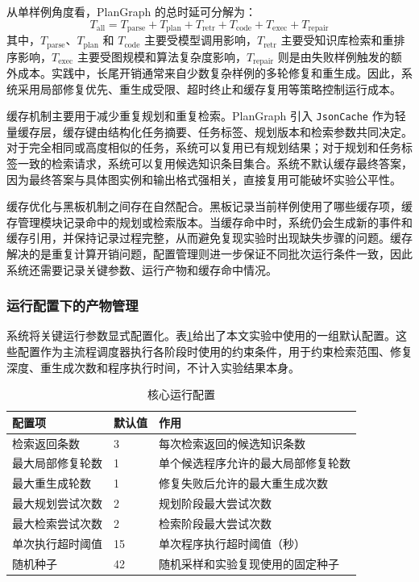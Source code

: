 从单样例角度看，PlanGraph 的总时延可分解为：
\begin{equation}
T_{\mathrm{all}}=T_{\mathrm{parse}}+T_{\mathrm{plan}}+T_{\mathrm{retr}}+T_{\mathrm{code}}+T_{\mathrm{exec}}+T_{\mathrm{repair}}
\end{equation}
其中，$T_{\mathrm{parse}}$、$T_{\mathrm{plan}}$ 和 $T_{\mathrm{code}}$ 主要受模型调用影响，$T_{\mathrm{retr}}$ 主要受知识库检索和重排序影响，$T_{\mathrm{exec}}$ 主要受图规模和算法复杂度影响，$T_{\mathrm{repair}}$ 则是由失败样例触发的额外成本。实践中，长尾开销通常来自少数复杂样例的多轮修复和重生成。因此，系统采用局部修复优先、重生成受限、超时终止和缓存复用等策略控制运行成本。

缓存机制主要用于减少重复规划和重复检索。PlanGraph 引入 \texttt{JsonCache} 作为轻量缓存层，缓存键由结构化任务摘要、任务标签、规划版本和检索参数共同决定。对于完全相同或高度相似的任务，系统可以复用已有规划结果；对于规划和任务标签一致的检索请求，系统可以复用候选知识条目集合。系统不默认缓存最终答案，因为最终答案与具体图实例和输出格式强相关，直接复用可能破坏实验公平性。

缓存优化与黑板机制之间存在自然配合。黑板记录当前样例使用了哪些缓存项，缓存管理模块记录命中的规划或检索版本。当缓存命中时，系统仍会生成新的事件和缓存引用，并保持记录过程完整，从而避免复现实验时出现缺失步骤的问题。缓存解决的是重复计算开销问题，配置管理则进一步保证不同批次运行条件一致，因此系统还需要记录关键参数、运行产物和缓存命中情况。

\subsubsection{运行配置下的产物管理}

系统将关键运行参数显式配置化。表\ref{tab:runtime_config}给出了本文实验中使用的一组默认配置。这些配置作为主流程调度器执行各阶段时使用的约束条件，用于约束检索范围、修复深度、重生成次数和程序执行时间，不计入实验结果本身。

\begin{table}[htbp]
\centering
\small
\caption{核心运行配置}
\label{tab:runtime_config}
\begin{tabular}{m{3.0cm}m{2.0cm}m{6.1cm}}
\toprule
配置项 & 默认值 & 作用 \\
\midrule
检索返回条数 & 3 & 每次检索返回的候选知识条数 \\
最大局部修复轮数 & 1 & 单个候选程序允许的最大局部修复轮数 \\
最大重生成轮数 & 1 & 修复失败后允许的最大重生成次数 \\
最大规划尝试次数 & 2 & 规划阶段最大尝试次数 \\
最大检索尝试次数 & 2 & 检索阶段最大尝试次数 \\
单次执行超时阈值 & 15 & 单次程序执行超时阈值（秒） \\
随机种子 & 42 & 随机采样和实验复现使用的固定种子 \\
\bottomrule
\end{tabular}
\end{table}

